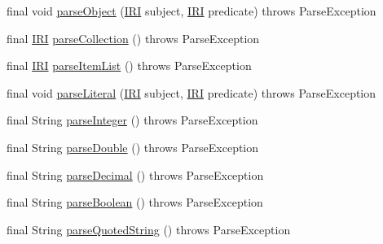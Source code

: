 \begin{DoxyCompactItemize}
\item 
final void \hyperlink{classuk_1_1ac_1_1manchester_1_1cs_1_1owl_1_1owlapi_1_1turtle_1_1parser_1_1_turtle_parser_aee90a94c76edf33d493b36867ffdc3d9}{parse\-Object} (\hyperlink{classorg_1_1semanticweb_1_1owlapi_1_1model_1_1_i_r_i}{I\-R\-I} subject, \hyperlink{classorg_1_1semanticweb_1_1owlapi_1_1model_1_1_i_r_i}{I\-R\-I} predicate)  throws Parse\-Exception 
\item 
final \hyperlink{classorg_1_1semanticweb_1_1owlapi_1_1model_1_1_i_r_i}{I\-R\-I} \hyperlink{classuk_1_1ac_1_1manchester_1_1cs_1_1owl_1_1owlapi_1_1turtle_1_1parser_1_1_turtle_parser_a1352c31cd30eb22b9e294424002c4e0a}{parse\-Collection} ()  throws Parse\-Exception 
\item 
final \hyperlink{classorg_1_1semanticweb_1_1owlapi_1_1model_1_1_i_r_i}{I\-R\-I} \hyperlink{classuk_1_1ac_1_1manchester_1_1cs_1_1owl_1_1owlapi_1_1turtle_1_1parser_1_1_turtle_parser_a83ed9c22c34c7db5c1dd3823a5d246b7}{parse\-Item\-List} ()  throws Parse\-Exception 
\item 
final void \hyperlink{classuk_1_1ac_1_1manchester_1_1cs_1_1owl_1_1owlapi_1_1turtle_1_1parser_1_1_turtle_parser_a08a1007a8085e5b1797d30a194b09ad0}{parse\-Literal} (\hyperlink{classorg_1_1semanticweb_1_1owlapi_1_1model_1_1_i_r_i}{I\-R\-I} subject, \hyperlink{classorg_1_1semanticweb_1_1owlapi_1_1model_1_1_i_r_i}{I\-R\-I} predicate)  throws Parse\-Exception 
\item 
final String \hyperlink{classuk_1_1ac_1_1manchester_1_1cs_1_1owl_1_1owlapi_1_1turtle_1_1parser_1_1_turtle_parser_a5a64808b86674d0c16f136fcccf91b84}{parse\-Integer} ()  throws Parse\-Exception 
\item 
final String \hyperlink{classuk_1_1ac_1_1manchester_1_1cs_1_1owl_1_1owlapi_1_1turtle_1_1parser_1_1_turtle_parser_a2b050ecf6be48abc0350e23eb1b808ea}{parse\-Double} ()  throws Parse\-Exception 
\item 
final String \hyperlink{classuk_1_1ac_1_1manchester_1_1cs_1_1owl_1_1owlapi_1_1turtle_1_1parser_1_1_turtle_parser_a00791682ba08f9505980ae6ecead6de2}{parse\-Decimal} ()  throws Parse\-Exception 
\item 
final String \hyperlink{classuk_1_1ac_1_1manchester_1_1cs_1_1owl_1_1owlapi_1_1turtle_1_1parser_1_1_turtle_parser_acaa146071fe30e56de678475289c8a8c}{parse\-Boolean} ()  throws Parse\-Exception 
\item 
final String \hyperlink{classuk_1_1ac_1_1manchester_1_1cs_1_1owl_1_1owlapi_1_1turtle_1_1parser_1_1_turtle_parser_ab146e32fbefc141046dae62b08a0b722}{parse\-Quoted\-String} ()  throws Parse\-Exception 

\end{DoxyCompactItemize}
